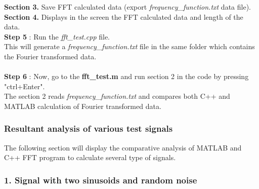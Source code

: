 \begin{refsection}
\textbf{Section 3.} Save FFT calculated data (export \textit{frequency\_function.txt} data file).\\
\textbf{Section 4.}  Displays in the screen the FFT calculated data and length of the data.\\

\textbf{Step 5} : Run the \textit{fft\_test.cpp} file.\\
This will generate a \textit{frequency\_function.txt} file in the same folder which contains the Fourier transformed data.\\ \\
\textbf{Step 6} : Now, go to the \textbf{fft\_test.m} and run section 2 in the code by pressing "ctrl+Enter".\\
The section 2 reads \textit{frequency\_function.txt} and compares both C++ and MATLAB calculation of Fourier transformed data.



\subsubsection{Resultant analysis of various test signals}

The following section will display the comparative analysis of MATLAB and C++ FFT program to calculate several type of signals.

\subsubsection{1. Signal with two sinusoids and random noise}


\end{refsection}
